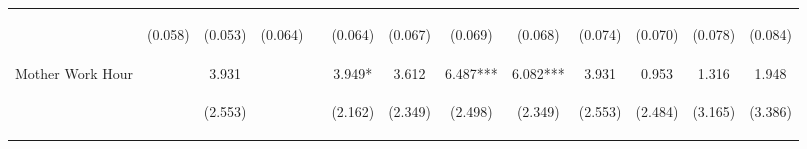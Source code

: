 \begin{tabular}{lcccccccccccc}
 & \begin{footnotesize}(0.058)\end{footnotesize} & \begin{footnotesize}(0.053)\end{footnotesize} & \begin{footnotesize}(0.064)\end{footnotesize} & \begin{footnotesize}\end{footnotesize} & \begin{footnotesize}(0.064)\end{footnotesize} & \begin{footnotesize}(0.067)\end{footnotesize} & \begin{footnotesize}(0.069)\end{footnotesize} & \begin{footnotesize}(0.068)\end{footnotesize} & \begin{footnotesize}(0.074)\end{footnotesize} & \begin{footnotesize}(0.070)\end{footnotesize} & \begin{footnotesize}(0.078)\end{footnotesize} & \begin{footnotesize}(0.084)\end{footnotesize}\\
\noalign{\smallskip}Mother Work Hour &  & 3.931 &  &  & 3.949* & 3.612 & 6.487*** & 6.082*** & 3.931 & 0.953 & 1.316 & 1.948\\
 & \begin{footnotesize}\end{footnotesize} & \begin{footnotesize}(2.553)\end{footnotesize} & \begin{footnotesize}\end{footnotesize} & \begin{footnotesize}\end{footnotesize} & \begin{footnotesize}(2.162)\end{footnotesize} & \begin{footnotesize}(2.349)\end{footnotesize} & \begin{footnotesize}(2.498)\end{footnotesize} & \begin{footnotesize}(2.349)\end{footnotesize} & \begin{footnotesize}(2.553)\end{footnotesize} & \begin{footnotesize}(2.484)\end{footnotesize} & \begin{footnotesize}(3.165)\end{footnotesize} & \begin{footnotesize}(3.386)\end{footnotesize}\\

\end{tabular}
